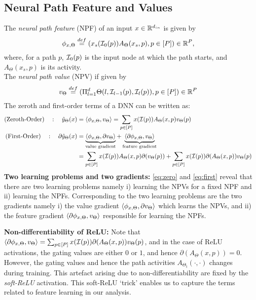 \subsection{Neural Path Feature and Values}
The \emph{neural path feature} (NPF) of an input $x\in\mathbb{R}^{d_{in}}$ is given by 
\begin{align}\label{eq:npfdef}
\phi_{x,\Theta}\stackrel{def}=(x_s(\mathcal{I}_0(p))A_{\Theta}(x_s,p) ,p\in[P])\in\mathbb{R}^P,
\end{align}
where, for a path $p$, $\mathcal{I}_0(p)$ is the input node at which the path starts, and $A_{\Theta}(x_s,p)$ is its activity. \\
The \emph{neural path value} (NPV) if given by  
\begin{align}\label{eq:npvdef}
v_{\Theta}\stackrel{def}=(\Pi_{l=1}^d \Theta(l,\mathcal{I}_{l-1}(p),\mathcal{I}_l(p)),p\in[P])\in\mathbb{R}^P
\end{align}
The zeroth and first-order terms of a DNN can be written as:
\begin{align}
\label{eq:zero}\text{(Zeroth-Order)}\quad: \quad \hat{y}_{\Theta}(x)&=\langle \phi_{x,\Theta},v_{\Theta}\rangle=\sum_{p\in [P]}x(\mathcal{I}(p))A_{\Theta}(x,p)v_{\Theta}(p)\\
\label{eq:first}\text{(First-Order)}\quad: \quad \partial \hat{y}_{\Theta}(x)&=\underbrace{\langle \phi_{x,\Theta},\partial v_{\Theta}\rangle}_{\text{value gradient}}+ \underbrace{\langle \partial\phi_{x,\Theta},v_{\Theta}\rangle}_{\text{feature gradient}}\\&=\sum_{p\in [P]}x(\mathcal{I}(p)) A_{\Theta}(x,p) \partial(v_{\Theta}(p))+\sum_{p\in [P]}x(\mathcal{I}(p)) \partial(A_{\Theta}(x,p)) v_{\Theta}(p)\nonumber
\end{align}
\textbf{Two learning problems and two gradients:} \eqref{eq:zero} and \eqref{eq:first} reveal that there are two learning problems namely i) learning the NPVs for a fixed NPF and ii) learning the NPFs. Corresponding to the two learning problems are the two gradients namely i) the value gradient $\langle \phi_{x,\Theta},\partial v_{\Theta}\rangle$ which learns the NPVs, and ii) the feature gradient $\langle \partial\phi_{x,\Theta},v_{\Theta}\rangle$ responsible for learning the NPFs. 

\textbf{Non-differentiability of ReLU:} Note that $\langle \partial\phi_{x,\Theta},v_{\Theta}\rangle=\sum_{p\in [P]}x(\mathcal{I}(p)) \partial(A_{\Theta}(x,p)) v_{\Theta}(p)$, and in the case of ReLU activations, the gating values are either $0$ or $1$, and hence $\partial(A_{\Theta}(x,p))=0$. However, the gating values and hence the path activities $A_{\Theta_t}(\cdot,\cdot)$ changes during training. This artefact arising due to non-differentiability are fixed by the \emph{soft-ReLU} activation. This soft-ReLU `trick' enables us to capture the terms related to feature learning in our analysis. %
